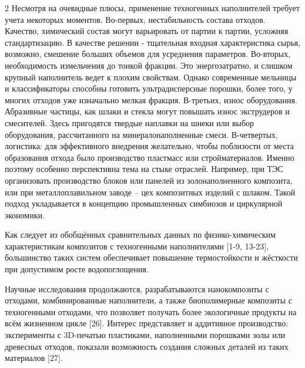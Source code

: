 \begin{multicols}{2}
Несмотря на очевидные плюсы, применение техногенных наполнителей требует
учета некоторых моментов. Во-первых, нестабильность состава отходов.
Качество, химический состав могут варьировать от партии к партии,
усложняя стандартизацию. В качестве решении - тщательная входная
характеристика сырья, возможно, смешение больших объемов для усреднения
параметров. Во-вторых, необходимость измельчения до тонкой фракции. Это
энергозатратно, и слишком крупный наполнитель ведет к плохим свойствам.
Однако современные мельницы и классификаторы способны готовить
ультрадисперсные порошки, более того, у многих отходов уже изначально
мелкая фракция. В-третьих, износ оборудования. Абразивные частицы, как
шлаки и стекла могут повышать износ экструдеров и смесителей. Здесь
пригодятся твердые наплавки на шнеки или выбор оборудования,
рассчитанного на минералонаполненные смеси. В-четвертых, логистика: для
эффективного внедрения желательно, чтобы поблизости от места образования
отхода было производство пластмасс или стройматериалов. Именно поэтому
особенно перспективна тема на стыке отраслей. Например, при ТЭС
организовать производство блоков или панелей из золонаполненного
композита, или при металлоплавильном заводе -- цех композитных изделий с
шлаком. Такой подход укладывается в концепцию промышленных симбиозов и
циркулярной экономики.

Как следует из обобщённых сравнительных данных по физико-химическим
характеристикам композитов с техногенными наполнителями {[}1-9,
13-23{]}, большинство таких систем обеспечивает повышение термостойкости
и жёсткости при допустимом росте водопоглощения.

Научные исследования продолжаются, разрабатываются нанокомпозиты с
отходами, комбинированные наполнители, а также биополимерные композиты с
техногенными отходами, что позволяет получать более экологичные продукты
на всём жизненном цикле {[}26{]}. Интерес представляет и аддитивное
производство: эксперименты с 3D-печатью пластиками, наполненными
порошками золы или древесных отходов, показали возможность создания
сложных деталей из таких материалов {[}27{]}.


\end{multicols}
